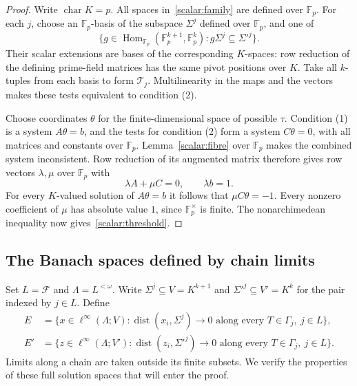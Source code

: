 \documentclass[11pt]{amsart}
\theoremstyle{definition}
\theoremstyle{remark}
\numberwithin{equation}{section}
\newcommand{\F}{\mathbb F}
\newcommand{\linf}{\ell^\infty}
\begin{document}
\begin{proof}
Write $\operatorname{char}K=p$. All spaces in~\eqref{scalar:family} are defined over $\F_p$.
For each $j$, choose an $\F_p$\nobreakdash-basis of the subspace $\Sigma^j$ defined over $\F_p$, and one of
\[
 \{g\in\operatorname{Hom}_{\F_p}(\F_p^{k+1},\F_p^k):g\Sigma^j\subseteq\Sigma'^j\}.
\]
Their scalar extensions are bases of the corresponding $K$\nobreakdash-spaces: row reduction of the
defining prime-field matrices has the same pivot positions over $K$. Take all $k$\nobreakdash-tuples from
each basis to form $\mathcal T_j$. Multilinearity in the maps and the vectors makes these tests equivalent
to condition (2).

Choose coordinates $\theta$ for the finite-dimensional space of possible $\tau$. Condition (1) is a
system $A\theta=b$, and the tests for condition (2) form a system $C\theta=0$, with all matrices and
constants over $\F_p$. Lemma~\ref{scalar:fibre} over $\F_p$ makes the combined system inconsistent.
Row reduction of its augmented matrix therefore gives row vectors $\lambda,\mu$ over $\F_p$ with
\[
 \lambda A+\mu C=0,\qquad \lambda b=1.
\]
For every $K$\nobreakdash-valued solution of $A\theta=b$ it follows that $\mu C\theta=-1$.
Every nonzero coefficient of $\mu$ has absolute value $1$, since $\F_p^\times$ is finite.
The nonarchimedean inequality now gives~\eqref{scalar:threshold}.
\end{proof}

\subsection{The Banach spaces defined by chain limits}

Set $L=\mathcal F$ and $\Lambda=L^{<\omega}$. Write $\Sigma^j\subseteq V=K^{k+1}$ and
$\Sigma'^j\subseteq V'=K^k$ for the pair indexed by $j\in L$. Define
\begin{equation}\label{scalar:spaces}
 \begin{split}
 E&=\{x\in\linf(\Lambda;V):
       \operatorname{dist}(x_i,\Sigma^j)\longrightarrow0
       \text{ along every }T\in\Gamma_j,\ j\in L\},\\
 E'&=\{z\in\linf(\Lambda;V'):
       \operatorname{dist}(z_i,\Sigma'^j)\longrightarrow0
       \text{ along every }T\in\Gamma_j,\ j\in L\}.
 \end{split}
\end{equation}
Limits along a chain are taken outside its finite subsets. We verify the properties of these full
solution spaces that will enter the proof.
\end{document}
